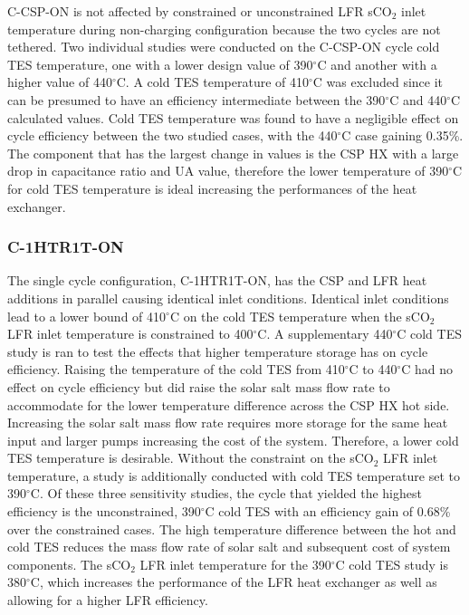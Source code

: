 \begin{paracol}{2}
C-CSP-ON is not affected by constrained or unconstrained LFR sCO$_2$ inlet temperature during non-charging configuration because the two cycles are not tethered. Two individual studies were conducted on the C-CSP-ON cycle cold TES temperature, one with a lower design value of 390$^{\circ}$C and another with a higher value of 440$^{\circ}$C. A cold TES temperature of 410$^{\circ}$C was excluded since it can be presumed to have an efficiency intermediate between the 390$^{\circ}$C and 440$^{\circ}$C calculated values. Cold TES temperature was found to have a negligible effect on cycle efficiency between the two studied cases, with the 440$^{\circ}$C case gaining 0.35\%. The component that has the largest change in values is the CSP HX with a large drop in capacitance ratio and UA value, therefore the lower temperature of 390$^{\circ}$C for cold TES temperature is ideal increasing the performances of the heat exchanger. 


\subsubsection{C-1HTR1T-ON}
The single cycle configuration, C-1HTR1T-ON, has the CSP and LFR heat additions in parallel causing identical inlet conditions. Identical inlet conditions lead to a lower bound of 410$^{\circ}$C on the cold TES temperature when the sCO$_2$ LFR inlet temperature is constrained to 400$^{\circ}$C. A supplementary 440$^{\circ}$C cold TES study is ran to test the effects that higher temperature storage has on cycle efficiency. Raising the temperature of the cold TES from 410$^{\circ}$C to 440$^{\circ}$C had no effect on cycle efficiency but did raise the solar salt mass flow rate to accommodate for the lower temperature difference across the CSP HX hot side. Increasing the solar salt mass flow rate requires more storage for the same heat input and larger pumps increasing the cost of the system. Therefore, a lower cold TES temperature is desirable. Without the constraint on the sCO$_2$ LFR inlet temperature, a study is additionally conducted with cold TES temperature set to 390$^{\circ}$C. Of these three sensitivity studies, the cycle that yielded the highest efficiency is the unconstrained, 390$^{\circ}$C cold TES with an efficiency gain of 0.68\% over the constrained cases. The high temperature difference between the hot and cold TES reduces the mass flow rate of solar salt and subsequent cost of system components. The sCO$_2$ LFR inlet temperature for the 390$^{\circ}$C cold TES study is 380$^{\circ}$C, which increases the performance of the LFR heat exchanger as well as allowing for a higher LFR efficiency. 


\end{paracol}
